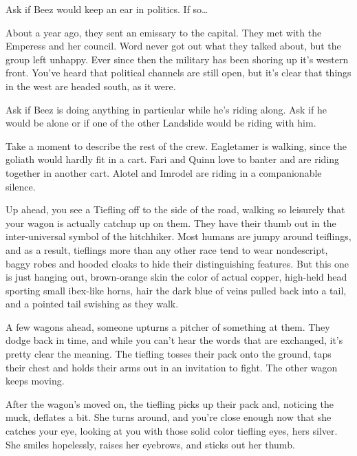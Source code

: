 \begin{multicols}{2}
Ask if Beez would keep an ear in politics.
If so\dots

  \begin{aloud}
  About a year ago, they sent an emissary to the capital.
  They met with the Emperess and her council.
  Word never got out what they talked about, but the group left unhappy.
  Ever since then the military has been shoring up it's western front.
  You've heard that political channels are still open, but it's clear that things in the west are
    headed south, as it were.
  \end{aloud}

Ask if Beez is doing anything in particular while he's riding along.
Ask if he would be alone or if one of the other Landslide would be riding with him.

Take a moment to describe the rest of the crew.
Eagletamer is walking, since the goliath would hardly fit in a cart.
Fari and Quinn love to banter and are riding together in another cart.
Alotel and Imrodel are riding in a companionable silence.

  \begin{aloud}
  Up ahead, you see a Tiefling off to the side of the road,
    walking so leisurely that your wagon is actually catchup up on them.
  They have their thumb out in the inter-universal symbol of the hitchhiker.
  Most humans are jumpy around teiflings, and as a result, tieflings more than any other race tend
    to wear nondescript, baggy robes and hooded cloaks to hide their distinguishing features.
  But this one is just hanging out, brown-orange skin the color of actual copper,
    high-held head sporting small ibex-like horns,
    hair the dark blue of veins pulled back into a tail,
    and a pointed tail swishing as they walk.
  \end{aloud}
\begin{aloud}

  A few wagons ahead, someone upturns a pitcher of something at them.
  They dodge back in time, and while you can't hear the words that are exchanged, it's pretty clear
    the meaning.
  The tiefling tosses their pack onto the ground, taps their chest and holds their arms out in
    an invitation to fight.
  The other wagon keeps moving.
\end{aloud}

\begin{aloud}
  After the wagon's moved on, the tiefling picks up their pack and, noticing the muck, deflates
    a bit.
  She turns around, and you're close enough now that she catches your eye, looking at you with
    those solid color tiefling eyes, hers silver.
  She smiles hopelessly, raises her eyebrows, and sticks out her thumb.
  \end{aloud}


\end{multicols}
